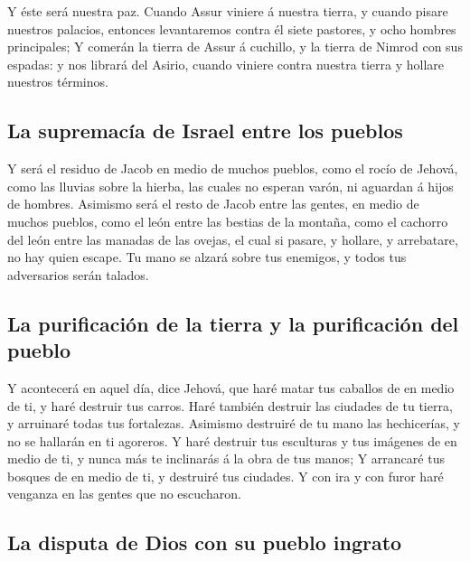  Y éste será nuestra paz. Cuando Assur viniere á nuestra
tierra, y cuando pisare nuestros palacios, entonces levantaremos contra
él siete pastores, y ocho hombres principales;  Y comerán la
tierra de Assur á cuchillo, y la tierra de Nimrod con sus espadas: y nos
librará del Asirio, cuando viniere contra nuestra tierra y hollare
nuestros términos.

\hypertarget{la-supremacuxeda-de-israel-entre-los-pueblos}{%
\subsection{La supremacía de Israel entre los
pueblos}\label{la-supremacuxeda-de-israel-entre-los-pueblos}}

 Y será el residuo de Jacob en medio de muchos pueblos, como
el rocío de Jehová, como las lluvias sobre la hierba, las cuales no
esperan varón, ni aguardan á hijos de hombres.  Asimismo
será el resto de Jacob entre las gentes, en medio de muchos pueblos,
como el león entre las bestias de la montaña, como el cachorro del león
entre las manadas de las ovejas, el cual si pasare, y hollare, y
arrebatare, no hay quien escape.  Tu mano se alzará sobre
tus enemigos, y todos tus adversarios serán talados.

\hypertarget{la-purificaciuxf3n-de-la-tierra-y-la-purificaciuxf3n-del-pueblo}{%
\subsection{La purificación de la tierra y la purificación del
pueblo}\label{la-purificaciuxf3n-de-la-tierra-y-la-purificaciuxf3n-del-pueblo}}

 Y acontecerá en aquel día, dice Jehová, que haré matar tus
caballos de en medio de ti, y haré destruir tus carros. 
Haré también destruir las ciudades de tu tierra, y arruinaré todas tus
fortalezas.  Asimismo destruiré de tu mano las hechicerías,
y no se hallarán en ti agoreros.  Y haré destruir tus
esculturas y tus imágenes de en medio de ti, y nunca más te inclinarás á
la obra de tus manos;  Y arrancaré tus bosques de en medio
de ti, y destruiré tus ciudades.  Y con ira y con furor
haré venganza en las gentes que no escucharon.

\hypertarget{la-disputa-de-dios-con-su-pueblo-ingrato}{%
\subsection{La disputa de Dios con su pueblo
ingrato}\label{la-disputa-de-dios-con-su-pueblo-ingrato}}


